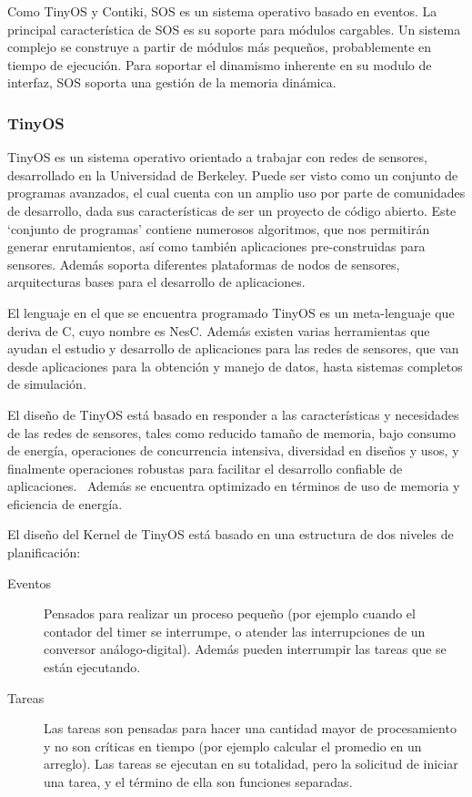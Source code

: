 Como TinyOS y Contiki, SOS es un sistema operativo basado en eventos. La principal característica de SOS es su soporte para módulos cargables. Un sistema complejo se construye a partir de módulos más pequeños, probablemente en tiempo de ejecución. Para soportar el dinamismo inherente en su modulo de interfaz, SOS soporta una gestión de la memoria dinámica.

 

\subsubsection{TinyOS}
TinyOS es un sistema operativo orientado a trabajar con redes de sensores, desarrollado en la Universidad de Berkeley. Puede ser visto como un conjunto de programas avanzados, el cual cuenta con un amplio uso por parte de comunidades de desarrollo, dada sus características de ser un proyecto de código abierto. Este ‘conjunto de programas’ contiene numerosos algoritmos, que nos permitirán generar enrutamientos, así como también aplicaciones pre-construidas para sensores. Además soporta diferentes plataformas de nodos de sensores, arquitecturas bases para el desarrollo de aplicaciones.



El lenguaje en el que se encuentra programado TinyOS es un meta-lenguaje que deriva de C, cuyo nombre es NesC. Además existen varias herramientas que ayudan el estudio y desarrollo de aplicaciones para las redes de sensores, que van desde aplicaciones para la obtención y manejo de datos, hasta sistemas completos de simulación.



El diseño de TinyOS está basado en responder a las características y necesidades de las redes de sensores, tales como reducido tamaño de memoria, bajo consumo de energía, operaciones de concurrencia intensiva, diversidad en diseños y usos, y finalmente operaciones robustas para facilitar el desarrollo confiable de aplicaciones. \ Además se encuentra optimizado en términos de uso de memoria y eficiencia de energía.



El diseño del Kernel de TinyOS está basado en una estructura de dos niveles de planificación:
\begin{description}
\item[Eventos] Pensados para realizar un proceso pequeño (por ejemplo cuando el contador del timer se interrumpe, o atender las interrupciones de un conversor análogo-digital). Además pueden interrumpir las tareas que se están ejecutando.
\item[Tareas] Las tareas son pensadas para hacer una cantidad mayor de procesamiento y no son críticas en tiempo (por ejemplo calcular el promedio en un arreglo). Las tareas se ejecutan en su totalidad, pero la solicitud de iniciar una tarea, y el término de ella son funciones separadas.
\end{description}



